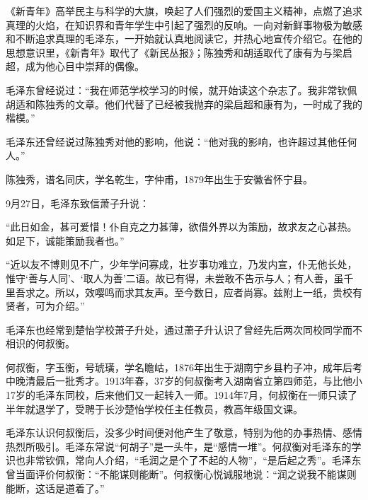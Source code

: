 \documentclass[../../dazhuan.tex]{subfiles}
\begin{document}
《新青年》高举民主与科学的大旗，唤起了人们强烈的爱国主义精神，点燃了追求真理的火焰，在知识界和青年学生中引起了强烈的反响。一向对新鲜事物极为敏感和不断追求真理的毛泽东，一开始就认真地阅读它，并热心地宣传介绍它。在他的思想意识里，《新青年》取代了《新民丛报》；陈独秀和胡适取代了康有为与梁启超，成为他心目中崇拜的偶像。

毛泽东曾经说过：“我在师范学校学习的时候，就开始读这个杂志了。我非常钦佩胡适和陈独秀的文章。他们代替了已经被我抛弃的梁启超和康有为，一时成了我的楷模。”

毛泽东还曾经说过陈独秀对他的影响，他说：“他对我的影响，也许超过其他任何人。”

陈独秀，谱名同庆，学名乾生，字仲甫，1879年出生于安徽省怀宁县。

9月27日，毛泽东致信萧子升说：

“此日如金，甚可爱惜！仆自克之力甚薄，欲借外界以为策励，故求友之心甚热。如足下，诚能策励我者也。”

“近以友不博则见不广，少年学问寡成，壮岁事功难立，乃发内宣，仆无他长处，惟守‘善与人同’、‘取人为善’二语。故已有得，未尝敢不告示与人；有人善，虽千里吾求之。所以，效嘤鸣而求其友声。至今数日，应者尚寡。兹附上一纸，贵校有贤者，可为介绍。”

毛泽东也经常到楚怡学校萧子升处，通过萧子升认识了曾经先后两次同校同学而不相识的何叔衡。

何叔衡，字玉衡，号琥璜，学名瞻岵，1876年出生于湖南宁乡县杓子冲，成年后考中晚清最后一批秀才。1913年春，37岁的何叔衡考入湖南省立第四师范，与比他小17岁的毛泽东同校，后来他们又一起转入一师。1914年7月，何叔衡在一师只读了半年就退学了，受聘于长沙楚怡学校任主任教员，教高年级国文课。

毛泽东认识何叔衡后，没多少时间便对他产生了敬意，特别为他的办事热情、感情热烈所吸引。毛泽东常说“何胡子”是一头牛，是“感情一堆”。何叔衡对毛泽东的学识也非常钦佩，常向人介绍，“毛润之是个了不起的人物”，“是后起之秀”。毛泽东曾当面评价何叔衡：“不能谋则能断”。何叔衡心悦诚服地说：“润之说我不能谋则能断，这话是道着了。”
\end{document}
